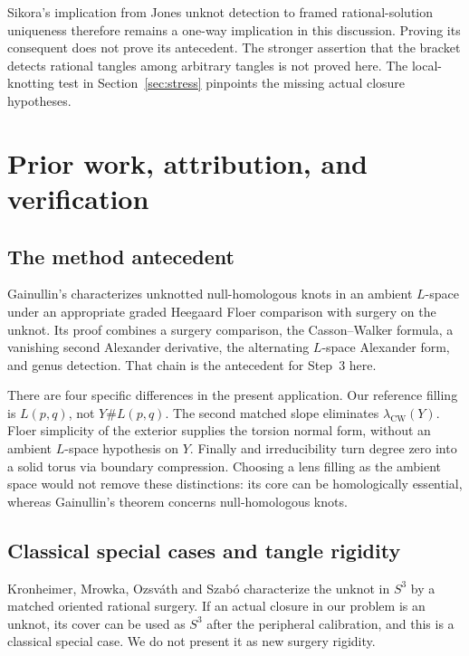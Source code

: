 \documentclass[11pt]{amsart}
\theoremstyle{definition}
\theoremstyle{remark}
\newcommand{\lCW}{\lambda_{\mathrm{CW}}}
\begin{document}
Sikora's implication
from Jones unknot
detection to framed
rational-solution
uniqueness therefore
remains a one-way
implication in this
discussion. Proving
its consequent
does not prove its
antecedent.
The stronger
assertion that the
bracket detects
rational tangles
among arbitrary
tangles is not
proved here.
The local-knotting
test in
Section~\ref{sec:stress}
pinpoints the
missing actual
closure hypotheses.

\section{Prior work, attribution, and verification}\label{sec:credit}

\subsection{The method antecedent}

Gainullin's
\cite[Theorem~8.2]{Gainullin}
characterizes
unknotted
null-homologous
knots in an
ambient \(L\)-space
under an appropriate
graded Heegaard
Floer comparison
with surgery on
the unknot.
Its proof combines
a surgery comparison,
the Casson--Walker
formula, a vanishing
second Alexander
derivative, the
alternating
\(L\)-space
Alexander form,
and genus detection.
That chain is the
antecedent for
Step~3 here.

There are four
specific differences
in the present
application.
Our reference
filling is
\(L(p,q)\), not
\(Y\#L(p,q)\).
The second matched
slope eliminates
\(\lCW(Y)\).
Floer simplicity
of the exterior
supplies the
torsion normal
form, without an
ambient \(L\)-space
hypothesis on \(Y\).
Finally
\cite[Corollary~2.3]{RR}
and irreducibility
turn degree zero
into a solid
torus via boundary
compression.
Choosing a lens
filling as the
ambient space
would not remove
these distinctions:
its core can be
homologically
essential, whereas
Gainullin's
theorem concerns
null-homologous
knots.

\subsection{Classical special cases and tangle rigidity}

Kronheimer,
Mrowka, Ozsv\'ath
and Szab\'o
\cite[Theorem~1.1]{KMOS}
characterize the
unknot in \(S^3\)
by a matched
oriented rational
surgery. If an
actual closure
in our problem
is an unknot,
its cover can be
used as \(S^3\)
after the
peripheral
calibration,
and this is a
classical special
case. We do not
present it as
new surgery
rigidity.
\end{document}
